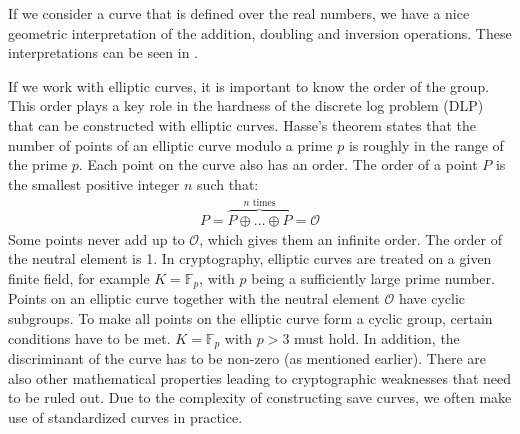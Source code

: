 %
If we consider a curve that is defined over the real numbers, we have a nice geometric interpretation of the addition, doubling and inversion operations.
These interpretations can be seen in .
%
\begin{figure}
	\centering
	\hspace{0.5cm}
	\hspace{0.5cm}
	\label{fig: elliptic curve operations geometric interpretation}
\end{figure}
%
If we work with elliptic curves, it is important to know the order of the group.
This order plays a key role in the hardness of the discrete log problem (DLP) that can be constructed with elliptic curves.
Hasse's theorem states that the number of points of an elliptic curve modulo a prime $p$ is roughly in the range of the prime $p$.
Each point on the curve also has an order.
The order of a point $P$ is the smallest positive integer $n$ such that:
%
\begin{align*}
[n]P = \overbrace{P \oplus \ldots \oplus P}^{n \text{ times}} = \mathcal{O}
\end{align*}
%
Some points never add up to $\mathcal{O}$, which gives them an infinite order.
The order of the neutral element is 1.
In cryptography, elliptic curves are treated on a given finite field, for example $K = \mathbb{F}_{p}$, with $p$ being a sufficiently large prime number.
Points on an elliptic curve together with the neutral element $\mathcal{O}$ have cyclic subgroups.
To make all points on the elliptic curve form a cyclic group, certain conditions have to be met.
$K = \mathbb{F}_{p}$ with $p > 3$ must hold.
In addition, the discriminant of the curve has to be non-zero (as mentioned earlier).
There are also other mathematical properties leading to cryptographic weaknesses that need to be ruled out.
Due to the complexity of constructing save curves, we often make use of standardized curves in practice.

